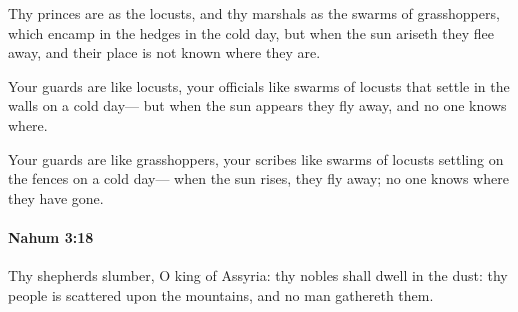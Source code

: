			\begin{versebox}
					\item[BHS] 
					\item[LXX] 
					\item[ASV] Thy princes are as the locusts, and thy marshals as the swarms of grasshoppers, which encamp in the hedges in the cold day, but when the sun ariseth they flee away, and their place is not known where they are.
					\item[NIV] Your guards are like locusts, your officials like swarms of locusts that settle in the walls on a cold day— but when the sun appears they fly away, and no one knows where.
					\item[NRSV] Your guards are like grasshoppers, your scribes like swarms of locusts settling on the fences on a cold day— when the sun rises, they fly away; no one knows where they have gone.
			\end{versebox}

		\paragraph{Nahum 3:18} %
			\label{NAHUM-3-18}

			Thy shepherds slumber, O king of Assyria: thy nobles shall dwell in the dust: thy people is scattered upon the mountains, and no man gathereth them.

